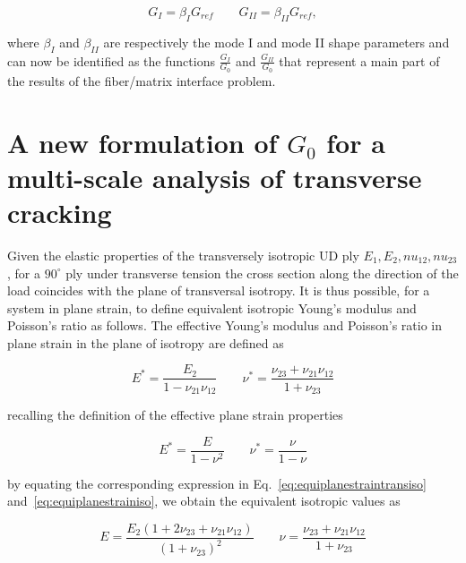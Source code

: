 \documentclass[a4paper]{jpconf}
\begin{document}
\begin{equation}
G_{I}=\beta_{I} G_{ref}\qquad G_{II}=\beta_{II} G_{ref},
\end{equation}

where $\beta_{I}$ and $\beta_{II}$ are respectively the mode I and mode II shape parameters and can now be identified as the functions $\frac{G_{I}}{G_{0}}$ and $\frac{G_{II}}{G_{0}}$ that represent a main part of the results of the fiber/matrix interface problem.


\section{A new formulation of $G_{0}$ for a multi-scale analysis of transverse cracking}

Given the elastic properties of the transversely isotropic UD ply $E_{1},E_{2},nu_{12},nu_{23}$, for a $90^{\circ}$ ply under transverse tension the cross section along the direction of the load coincides with the plane of transversal isotropy. It is thus possible, for a system in plane strain, to define equivalent isotropic Young's modulus and Poisson's ratio as follows. The effective Young's modulus and Poisson's ratio in plane strain in the plane of isotropy are defined as

\begin{equation}\label{eq:equiplanestraintransiso}
E^{*}=\frac{E_{2}}{1-\nu_{21}\nu_{12}}\qquad\nu^{*}=\frac{\nu_{23}+\nu_{21}\nu_{12}}{1+\nu_{23}}
\end{equation}

recalling the definition of the effective plane strain properties

\begin{equation}\label{eq:equiplanestrainiso}
E^{*}=\frac{E}{1-\nu^{2}}\qquad\nu^{*}=\frac{\nu}{1-\nu}
\end{equation}

by equating the corresponding expression in Eq.~\ref{eq:equiplanestraintransiso} and~\ref{eq:equiplanestrainiso}, we obtain the equivalent isotropic values as

\begin{equation}
E=\frac{E_{2}\left(1+2\nu_{23}+\nu_{21}\nu_{12}\right)}{\left(1+\nu_{23}\right)^{2}}\qquad\nu=\frac{\nu_{23}+\nu_{21}\nu_{12}}{1+\nu_{23}}
\end{equation}
\end{document}
